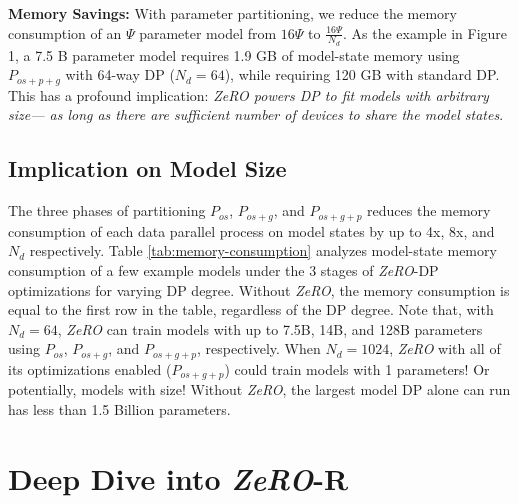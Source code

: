 \documentclass{article}
\newcommand{\name}{\emph{ZeRO}\xspace}
\begin{document}
\textbf{Memory Savings:} With parameter partitioning, we reduce the memory consumption of an $\Psi$ parameter model from $16\Psi$ to $\frac{16\Psi}{N_d}$.  As the example in Figure 1, a 7.5 B parameter model requires 1.9 GB  of model-state memory using $P_{os+p+g}$ with 64-way DP ($N_d = 64$), while requiring 120 GB with standard DP.  This has a profound implication: \emph{\name powers DP to fit models with arbitrary size— as long as there are sufficient number of devices to share the model states}. 
\subsection{Implication on Model Size}\label{sec:summarymemoryoptimization}
The three phases of partitioning $P_{os}$, $P_{os+g}$, and $P_{os+g+p}$ reduces the memory consumption of each data parallel process on model states by up to 4x, 8x, and $N_d$ respectively.  
  Table \ref{tab:memory-consumption} analyzes model-state memory consumption of a few example models under the 3 stages of \name-DP optimizations for varying DP degree.  Without \name, the memory consumption is equal to the first row in the table, regardless of the DP degree. Note that, with $N_d=64$, \name can train models with up to 7.5B, 14B, and 128B parameters using $P_{os}$, $P_{os+g}$, and $P_{os+g+p}$, respectively.  When $N_d=1024$, \name with all of its optimizations enabled ($P_{os+g+p}$) could train models with 1 {} parameters!  Or potentially, models with {} size!  Without \name, the largest model DP alone can run has less than 1.5 Billion parameters.
  
\section{Deep Dive into \name-R}
\end{document}
